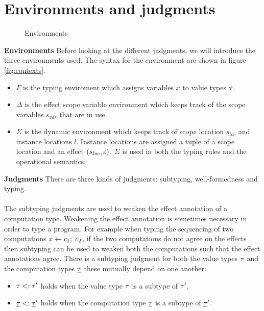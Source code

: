 {\section{Environments and judgments}
\label{sec:contexts}

\begin{figure}
\caption{Environments}
\centering
{}
\end{figure}

\textbf{Environments}
Before looking at the different judgments, we will introduce the three environments used.
The syntax for the environment are shown in figure \ref{fig:contexts}.
\begin{itemize}
\item $\Gamma$ is the typing enviroment which assigns variables $x$ to value types $\tau$.
\item $\Delta$ is the effect scope variable environment which keeps track of the scope variables $s_{var}$ that are in use.
\item $\Sigma$ is the dynamic environment which keeps track of scope location $s_{loc}$ and instance locations $l$. Instance locations are assigned a tuple of a scope location and an effect $(s_{loc}, \varepsilon)$. $\Sigma$ is used in both the typing rules and the operational semantics.
\end{itemize}

\textbf{Judgments}
There are three kinds of judgments: subtyping, well-formedness and typing.
\\\\
The subtyping judgments are used to weaken the effect annotation of a computation type.
Weakening the effect annotation is sometimes necessary in order to type a program.
For example when typing the sequencing of two computations $x \leftarrow c_1 ;\; c_2$, if the two computations do not agree on the effects then subtyping can be used to weaken both the computations such that the effect annotations agree.
There is a subtyping judgment for both the value types $\tau$ and the computation types $\underline{\tau}$ these mutually depend on one another:
\begin{itemize}
\setlength\itemsep{0.5em}
\item $\tau <: \tau'$ holds when the value type $\tau$ is a subtype of $\tau'$.
\item $\underline{\tau} <: \underline{\tau}'$ holds when the computation type $\underline{\tau}$ is a subtype of $\underline{\tau}'$.
\end{itemize}

}
